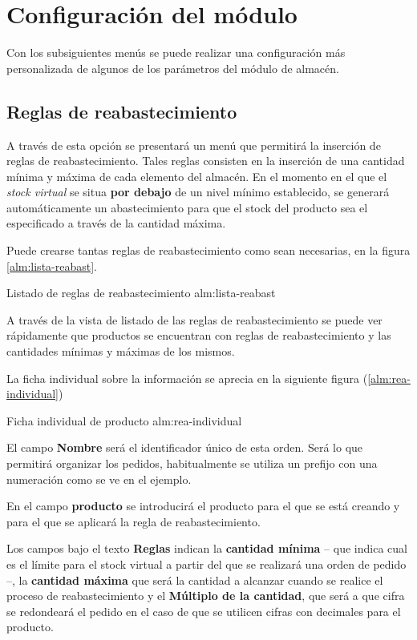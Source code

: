 


\section{Configuración del módulo}
Con los subsiguientes menús se puede realizar una configuración más personalizada de algunos de los parámetros del módulo de almacén.

\subsection{Reglas de reabastecimiento}
\label{alm:reabastecimiento}

A través de esta opción se presentará un menú que permitirá la inserción de reglas de reabastecimiento. Tales reglas consisten en la inserción de una cantidad mínima y máxima de cada elemento del almacén. En el momento en el que el \emph{stock virtual} se situa \textbf{por debajo} de un nivel mínimo establecido, se generará automáticamente un abastecimiento para que el stock del producto sea el especificado a través de la cantidad máxima.

Puede crearse tantas reglas de reabastecimiento como sean necesarias, en la figura \ref{alm:lista-reabast}.

{Listado de reglas de reabastecimiento}
{alm:lista-reabast}

A través de la vista de listado de las reglas de reabastecimiento se puede ver rápidamente que productos se encuentran con reglas de reabastecimiento y las cantidades mínimas y máximas de los mismos.

La ficha individual sobre la información se aprecia en la siguiente figura (\ref{alm:rea-individual})

{Ficha individual de producto}
{alm:rea-individual}

El campo \textbf{Nombre} será el identificador único de esta orden. Será lo que permitirá organizar los pedidos, habitualmente se utiliza un prefijo con una numeración como se ve en el ejemplo. 

En el campo \textbf{producto} se introducirá el producto para el que se está creando y para el que se aplicará la regla de reabastecimiento.

Los campos bajo el texto \textbf{Reglas} indican la \textbf{cantidad mínima} -- que indica cual es el límite para el stock virtual a partir del que se realizará una orden de pedido --, la \textbf{cantidad máxima} que será la cantidad a alcanzar cuando se realice el proceso de reabastecimiento y el \textbf{Múltiplo de la cantidad}, que será a que cifra se redondeará el pedido en el caso de que se utilicen cifras con decimales para el producto.

